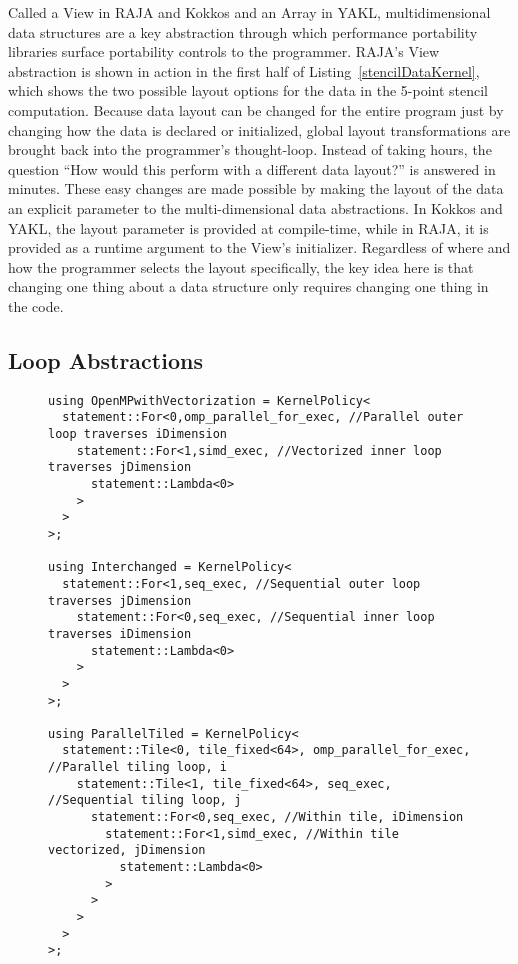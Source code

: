 Called a View in RAJA and Kokkos and an Array in YAKL, multidimensional data structures are a key abstraction through which performance portability libraries surface portability controls to the programmer.
RAJA's View abstraction is shown in action in the first half of Listing~\ref{stencilDataKernel}, which shows the two possible layout options for the data in the 5-point stencil computation.
Because data layout can be changed for the entire program just by changing how the data is declared or initialized, global layout transformations are brought back into the programmer's thought-loop.
Instead of taking hours, the question ``How would this perform with a different data layout?'' is answered in minutes.
These easy changes are made possible by making the layout of the data an explicit parameter to the multi-dimensional data abstractions.
In Kokkos and YAKL, the layout parameter is provided at compile-time, while in RAJA, it is provided as a runtime argument to the View's initializer.
Regardless of where and how the programmer selects the layout specifically, the key idea here is that changing one thing about a data structure only requires changing one thing in the code.

\subsection{Loop Abstractions}

\begin{figure}
\begin{lstlisting}[caption={Kernel policies for different loop schedules.}, label={stencilSchedule}]
using OpenMPwithVectorization = KernelPolicy<
  statement::For<0,omp_parallel_for_exec, //Parallel outer loop traverses iDimension
    statement::For<1,simd_exec, //Vectorized inner loop traverses jDimension
      statement::Lambda<0>
    >
  >
>;

using Interchanged = KernelPolicy<
  statement::For<1,seq_exec, //Sequential outer loop traverses jDimension
    statement::For<0,seq_exec, //Sequential inner loop traverses iDimension
      statement::Lambda<0>
    >
  >
>;

using ParallelTiled = KernelPolicy<
  statement::Tile<0, tile_fixed<64>, omp_parallel_for_exec, //Parallel tiling loop, i
    statement::Tile<1, tile_fixed<64>, seq_exec, //Sequential tiling loop, j
      statement::For<0,seq_exec, //Within tile, iDimension
        statement::For<1,simd_exec, //Within tile vectorized, jDimension
          statement::Lambda<0>
        >
      >
    >
  >
>;
\end{lstlisting}
\end{figure}

